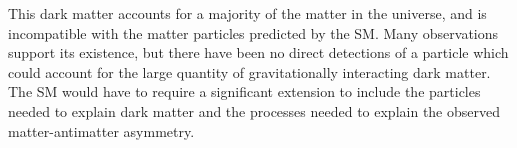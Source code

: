 This dark matter accounts for a majority of the matter in the universe, and is incompatible with the matter particles predicted by the \ac{SM}.
Many observations support its existence, but there have been no direct detections of a particle which could account for the large quantity of gravitationally interacting dark matter.
The \ac{SM} would have to require a significant extension to include the particles needed to explain dark matter and the processes needed to explain the observed matter-antimatter asymmetry. 
